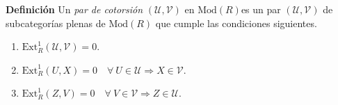 \documentclass[preview]{standalone}
\begin{document}
\begin{center}
\justifying \textbf{Definición} Un \emph{par de cotorsión} $(\mathcal{U}, \mathcal{V})$ en $\text{Mod}(R)$es un par $(\mathcal{U}, \mathcal{V})$ de subcategorías plenas de $\text{Mod}(R)$ que cumple las condiciones siguientes.\begin{enumerate} \item $\text{Ext}^1_R (\mathcal{U}, \mathcal{V}) = 0$. \item $\text{Ext}^1_R (U, X) = 0 \quad \forall \ U\in\mathcal{U} \Rightarrow X\in\mathcal{V}$. \item $\text{Ext}^1_R (Z, V) = 0 \quad \forall \ V\in\mathcal{V} \Rightarrow Z\in\mathcal{U}$. \end{enumerate}
\end{center}
\end{document}
